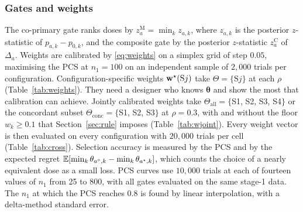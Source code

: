 \begin{table}
\centering\footnotesize
\caption{Dose effects $\theta_{a,k}=p_{a,k}-p_{0,k}$ in the four alternative configurations ($K=4$, $M=3$).}\label{tab:scen}

\end{table}

\begin{table}
\centering\footnotesize
\caption{Dose effects $\theta_{a,k}$ in the five null configurations.}\label{tab:nulls}

\end{table}

\subsubsection{Gates and weights}
The co-primary gate ranks doses by $z^{\mathrm{M}}_a=\min_k z_{a,k}$, where $z_{a,k}$ is the posterior $z$-statistic of $p_{a,k}-p_{0,k}$, and the composite gate by the posterior $z$-statistic $z^{\mathrm{C}}_a$ of $\Delta_a$. Weights are calibrated by \eqref{eq:weights} on a simplex grid of step $0.05$, maximising the PCS at $n_1=100$ on an independent sample of $2{,}000$ trials per configuration. Configuration-specific weights $\bw^\star(\mathrm{S}j)$ take $\Theta=\{\mathrm{S}j\}$ at each $\rho$ (Table~\ref{tab:weights}). They need a designer who knows $\bm\theta$ and show the most that calibration can achieve. Jointly calibrated weights take $\Theta_{\mathrm{all}}=\{$S1, S2, S3, S4$\}$ or the concordant subset $\Theta_{\mathrm{conc}}=\{$S1, S2, S3$\}$ at $\rho=0.3$, with and without the floor $w_k\ge0.1$ that Section~\ref{sec:rule} imposes (Table~\ref{tab:wjoint}). Every weight vector is then evaluated on every configuration with $20{,}000$ trials per cell (Table~\ref{tab:cross}). Selection accuracy is measured by the PCS and by the expected regret $\mathbb{E}[\min_k\theta_{a^\circ,k}-\min_k\theta_{a^\star,k}]$, which counts the choice of a nearly equivalent dose as a small loss. PCS curves use $10{,}000$ trials at each of fourteen values of $n_1$ from 25 to 800, with all gates evaluated on the same stage-1 data. The $n_1$ at which the PCS reaches $0.8$ is found by linear interpolation, with a delta-method standard error.

\begin{table}
\centering\footnotesize
\caption{Configuration-specific weights $\bw^\star(\mathrm{S}j)$ from \eqref{eq:weights} at $n_1=100$, and concordance of uniform and calibrated weights.}\label{tab:weights}

\end{table}

